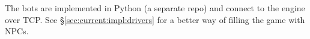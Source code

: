 The bots are implemented in Python (a separate repo) and connect to the
engine over TCP\@.
See \S\ref{sec:current:impl:drivers} for a better way of filling the game
with NPCs.
